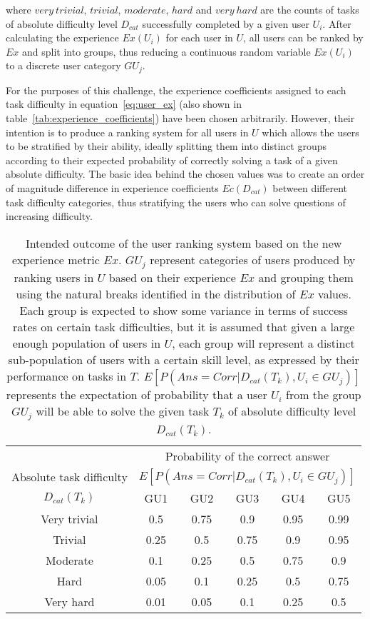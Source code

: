 where $very~trivial$, $trivial$, $moderate$, $hard$ and $very~hard$ are the counts of tasks of absolute difficulty level $D_{cat}$ successfully completed by a given user $U_i$.
After calculating the experience $Ex(U_i)$ for each user in $U$, all users can be ranked by $Ex$ and split into groups, thus reducing a continuous random variable $Ex(U_i)$ to a discrete user category $GU_j$.

For the purposes of this challenge, the experience coefficients assigned to each task difficulty in equation~\ref{eq:user_ex} (also shown in table~\ref{tab:experience_coefficients}) have been chosen arbitrarily.
However, their intention is to produce a ranking system for all users in $U$ which allows the users to be stratified by their ability, ideally splitting them into distinct groups according to their expected probability of correctly solving a task of a given absolute difficulty.
The basic idea behind the chosen values was to create an order of magnitude difference in experience coefficients $Ec(D_{cat})$ between different task difficulty categories, thus stratifying the users who can solve questions of increasing difficulty.

\begin{table}[h!]
    \centering
    \begin{tabular}{ c || c | c | c | c | c }
        \toprule
        \hline
        {} & \multicolumn{5}{c}{Probability of the correct answer} \\
        Absolute task difficulty & \multicolumn{5}{c}{$E[P(Ans=Corr|D_{cat}(T_k), U_i \in GU_j)]$} \\
        \hline
        $D_{cat}(T_k)$ & GU1 & GU2 & GU3 & GU4 & GU5 \\
        \hline
        \midrule
        \hline
        Very trivial & 0.5 & 0.75 & 0.9 & 0.95 & 0.99 \\
        \hline
        Trivial & 0.25 & 0.5 & 0.75 & 0.9 & 0.95 \\
        \hline
        Moderate & 0.1 & 0.25 & 0.5 & 0.75 & 0.9 \\
        \hline
        Hard & 0.05 & 0.1 & 0.25 & 0.5 & 0.75 \\
        \hline
        Very hard & 0.01 & 0.05 & 0.1 & 0.25 & 0.5 \\
        \hline
        \bottomrule
    \end{tabular}
    \caption{Intended outcome of the user ranking system based on the new experience metric $Ex$.
    $GU_j$ represent categories of users produced by ranking users in $U$ based on their experience $Ex$ and grouping them using the natural breaks identified in the distribution of $Ex$ values.
    Each group is expected to show some variance in terms of success rates on certain task difficulties, but it is assumed that given a large enough population of users in $U$, each group will represent a distinct sub-population of users with a certain skill level, as expressed by their performance on tasks in $T$.
    $E[P(Ans=Corr|D_{cat}(T_k), U_i \in GU_j)]$ represents the expectation of probability that a user $U_i$ from the group $GU_j$ will be able to solve the given task $T_k$ of absolute difficulty level $D_{cat}(T_k)$.}
    \label{tab:user_stratification}
\end{table}

